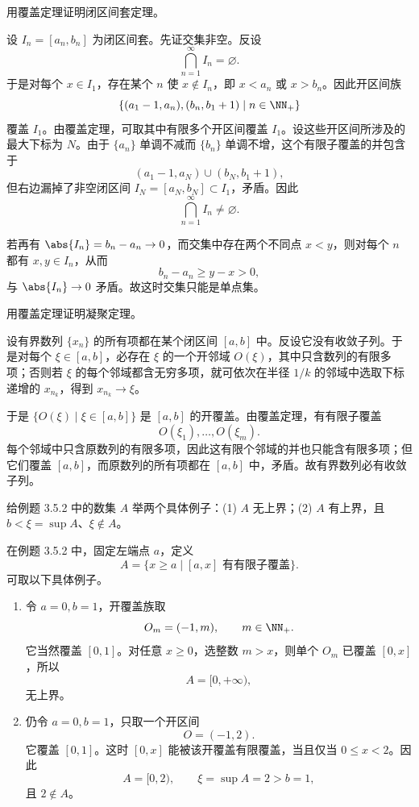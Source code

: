 \begin{xexercise}[3.5.3 练习题 3]
用覆盖定理证明闭区间套定理。
\end{xexercise}
\begin{xsolution}
设 $I_n=[a_n,b_n]$ 为闭区间套。先证交集非空。反设
\[
  \bigcap_{n=1}^{\infty}I_n=\varnothing.
\]
于是对每个 $x\in I_1$，存在某个 $n$ 使 $x\notin I_n$，即 $x<a_n$ 或 $x>b_n$。因此开区间族
\[
  \{(a_1-1,a_n),(b_n,b_1+1)\mid n\in\NN_+\}
\]
覆盖 $I_1$。由覆盖定理，可取其中有限多个开区间覆盖 $I_1$。设这些开区间所涉及的最大下标为 $N$。由于 $\{a_n\}$ 单调不减而 $\{b_n\}$ 单调不增，这个有限子覆盖的并包含于
\[
  (a_1-1,a_N)\cup(b_N,b_1+1),
\]
但右边漏掉了非空闭区间 $I_N=[a_N,b_N]\subset I_1$，矛盾。因此
\[
  \bigcap_{n=1}^{\infty}I_n\neq\varnothing.
\]

若再有 $\abs{I_n}=b_n-a_n\to0$，而交集中存在两个不同点 $x<y$，则对每个 $n$ 都有 $x,y\in I_n$，从而
\[
  b_n-a_n\geqslant y-x>0,
\]
与 $\abs{I_n}\to0$ 矛盾。故这时交集只能是单点集。
\end{xsolution}

\begin{xexercise}[3.5.3 练习题 4]
用覆盖定理证明凝聚定理。
\end{xexercise}
\begin{xsolution}
设有界数列 $\{x_n\}$ 的所有项都在某个闭区间 $[a,b]$ 中。反设它没有收敛子列。于是对每个 $\xi\in[a,b]$，必存在 $\xi$ 的一个开邻域 $O(\xi)$，其中只含数列的有限多项；否则若 $\xi$ 的每个邻域都含无穷多项，就可依次在半径 $1/k$ 的邻域中选取下标递增的 $x_{n_k}$，得到 $x_{n_k}\to\xi$。

于是 $\{O(\xi)\mid\xi\in[a,b]\}$ 是 $[a,b]$ 的开覆盖。由覆盖定理，有有限子覆盖
\[
  O(\xi_1),\ldots,O(\xi_m).
\]
每个邻域中只含原数列的有限多项，因此这有限个邻域的并也只能含有限多项；但它们覆盖 $[a,b]$，而原数列的所有项都在 $[a,b]$ 中，矛盾。故有界数列必有收敛子列。
\end{xsolution}

\begin{xexercise}[3.5.3 练习题 5]
给例题 3.5.2 中的数集 $A$ 举两个具体例子：(1) $A$ 无上界；(2) $A$ 有上界，且 $b<\xi=\sup A$、$\xi\notin A$。
\end{xexercise}
\begin{xsolution}
在例题 3.5.2 中，固定左端点 $a$，定义
\[
  A=\{x\geqslant a\mid [a,x]\text{ 有有限子覆盖}\}.
\]
可取以下具体例子。
\begin{enumerate}[label=(\arabic*)]
  \item 令 $a=0,b=1$，开覆盖族取
  \[
    O_m=(-1,m),\qquad m\in\NN_+.
  \]
  它当然覆盖 $[0,1]$。对任意 $x\geqslant0$，选整数 $m>x$，则单个 $O_m$ 已覆盖 $[0,x]$，所以
  \[
    A=[0,+\infty),
  \]
  无上界。

  \item 仍令 $a=0,b=1$，只取一个开区间
  \[
    O=(-1,2).
  \]
  它覆盖 $[0,1]$。这时 $[0,x]$ 能被该开覆盖有限覆盖，当且仅当 $0\leqslant x<2$。因此
  \[
    A=[0,2),\qquad \xi=\sup A=2>b=1,
  \]
  且 $2\notin A$。
\end{enumerate}
\end{xsolution}

